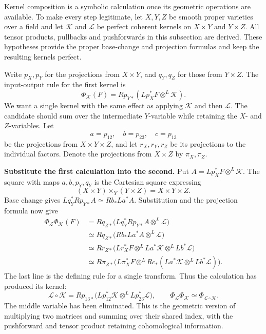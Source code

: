 \documentclass[11pt]{article}
\theoremstyle{remark}
\begin{document}
Kernel composition is a symbolic calculation once its geometric operations are available. To make every step legitimate, let \(X,Y,Z\) be smooth proper varieties over a field and let \(\mathcal K\) and \(\mathcal L\) be perfect coherent kernels on \(X\times Y\) and \(Y\times Z\). All tensor products, pullbacks and pushforwards in this subsection are derived. These hypotheses provide the proper base-change and projection formulas and keep the resulting kernels perfect.

Write \(p_X,p_Y\) for the projections from \(X\times Y\), and \(q_Y,q_Z\) for those from \(Y\times Z\). The input-output rule for the first kernel is
\[
\Phi_{\mathcal K}(F)=Rp_{Y*}(Lp_X^*F\otimes^L\mathcal K).
\]
We want a single kernel with the same effect as applying \(\mathcal K\) and then \(\mathcal L\). The candidate should sum over the intermediate \(Y\)-variable while retaining the \(X\)- and \(Z\)-variables. Let
\[
a=p_{12},\quad b=p_{23},\quad c=p_{13}
\]
be the projections from \(X\times Y\times Z\), and let \(r_X,r_Y,r_Z\) be its projections to the individual factors. Denote the projections from \(X\times Z\) by \(\pi_X,\pi_Z\).

\textbf{Substitute the first calculation into the second.}
Put \(A=Lp_X^*F\otimes^L\mathcal K\). The square with maps \(a,b,p_Y,q_Y\) is the Cartesian square expressing
\[
(X\times Y)\times_Y(Y\times Z)=X\times Y\times Z.
\]
Base change gives \(Lq_Y^*Rp_{Y*}A\simeq Rb_*La^*A\). Substitution and the projection formula now give
\[
\begin{aligned}
\Phi_{\mathcal L}\Phi_{\mathcal K}(F)
&=Rq_{Z*}\bigl(Lq_Y^*Rp_{Y*}A\otimes^L\mathcal L\bigr)\\
&\simeq Rq_{Z*}\bigl(Rb_*La^*A\otimes^L\mathcal L\bigr)\\
&\simeq Rr_{Z*}\bigl(Lr_X^*F\otimes^L La^*\mathcal K
                                   \otimes^L Lb^*\mathcal L\bigr)\\
&\simeq R\pi_{Z*}\bigl(L\pi_X^*F\otimes^L
              Rc_*(La^*\mathcal K\otimes^L Lb^*\mathcal L)\bigr).
\end{aligned}
\]
The last line is the defining rule for a single transform. Thus the calculation has produced its kernel:
\[
\mathcal L\circ\mathcal K
=Rp_{13*}\bigl(Lp_{12}^*\mathcal K\otimes^L Lp_{23}^*\mathcal L\bigr),
\qquad
\Phi_{\mathcal L}\Phi_{\mathcal K}\simeq\Phi_{\mathcal L\circ\mathcal K}.
\]
The middle variable has been eliminated. This is the geometric version of multiplying two matrices and summing over their shared index, with the pushforward and tensor product retaining cohomological information.
\end{document}
